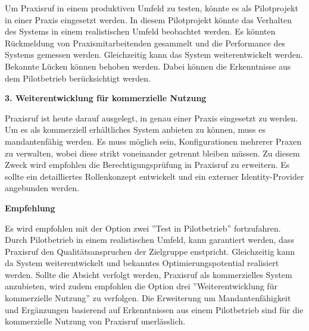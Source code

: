 Um Praxisruf in einem produktiven Umfeld zu testen, könnte es als Pilotprojekt in einer Praxis eingesetzt werden.
In diesem Pilotprojekt könnte das Verhalten des Systems in einem realistischen Umfeld beobachtet werden.
Es könnten Rückmeldung von Praxismitarbeitenden gesammelt und die Performance des Systems gemessen werden.
Gleichzeitig kann das System weiterentwickelt werden.
Bekannte Lücken können behoben werden.
Dabei können die Erkenntnisse aus dem Pilotbetrieb berücksichtigt werden.

\textbf{3. Weiterentwicklung für kommerzielle Nutzung}

Praxisruf ist heute darauf ausgelegt, in genau einer Praxis eingesetzt zu werden.
Um es als kommerziell erhältliches System anbieten zu können, muss es mandantenfähig werden.
Es muss möglich sein, Konfigurationen mehrerer Praxen zu verwalten, wobei diese strikt voneinander getrennt bleiben müssen.
Zu diesem Zweck wird empfohlen die Berechtigungsprüfung in Praxisruf zu erweitern.
Es sollte ein detailliertes Rollenkonzept entwickelt und ein externer Identity-Provider angebunden werden.

\textbf{Empfehlung}

Es wird empfohlen mit der Option zwei ''Test in Pilotbetrieb'' fortzufahren.
Durch Pilotbetrieb in einem realistischen Umfeld, kann garantiert werden, dass Praxisruf den Qualitätsanspruchen der Zielgruppe enstpricht.
Gleichzeitig kann da System weiterentwickelt und bekanntes Optimierungspotential realisiert werden.
Sollte die Absicht verfolgt werden, Praxisruf als kommerzielles System anzubieten, wird zudem empfohlen die Option drei ''Weiterentwicklung für kommerzielle Nutzung'' zu verfolgen.
Die Erweiterung um Mandantenfähigkeit und Ergänzungen basierend auf Erkenntnissen aus einem Pilotbetrieb sind für die kommerzielle Nutzung von Praxisruf unerlässlich.

\clearpage
